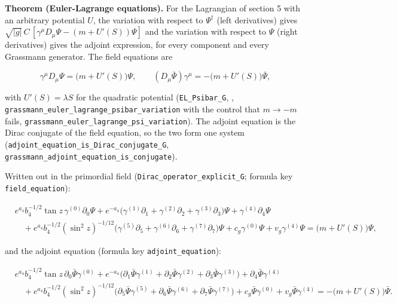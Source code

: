 \documentclass[11pt]{article}
\begin{document}
\textbf{Theorem (Euler-Lagrange equations).} For the Lagrangian of section 5 with an arbitrary potential $U$, the variation with respect to $\Psi^\dagger$ (left derivatives) gives $\sqrt{|g|}\,C\,[\gamma^\mu D_\mu\Psi - (m + U'(S))\Psi]$ and the variation with respect to $\Psi$ (right derivatives) gives the adjoint expression, for every component and every Grassmann generator. The field equations are

\[
\gamma^\mu D_\mu\Psi = \big(m + U'(S)\big)\Psi,\qquad (D_\mu\bar\Psi)\gamma^\mu = -\big(m + U'(S)\big)\bar\Psi,
\]

with $U'(S) = \lambda S$ for the quadratic potential (\texttt{EL\_Psiba\allowbreak{}r\_G}, \texttt{}, \texttt{grassman\allowbreak{}n\_euler\_\allowbreak{}lagrange\allowbreak{}\_psibar\_\allowbreak{}variatio\allowbreak{}n} with the control that $m \to -m$ fails, \texttt{grassman\allowbreak{}n\_euler\_\allowbreak{}lagrange\allowbreak{}\_psi\_var\allowbreak{}iation}). The adjoint equation is the Dirac conjugate of the field equation, so the two form one system (\texttt{adjoint\_\allowbreak{}equation\allowbreak{}\_is\_Dira\allowbreak{}c\_conjug\allowbreak{}ate\_G}, \texttt{grassman\allowbreak{}n\_adjoin\allowbreak{}t\_equati\allowbreak{}on\_is\_co\allowbreak{}njugate}).

Written out in the primordial field (\texttt{Dirac\_op\allowbreak{}erator\_e\allowbreak{}xplicit\_\allowbreak{}G}; formula key \texttt{field\_eq\allowbreak{}uation}):

\[
\begin{aligned}
&e^{a_4}b_4^{-1/2}\tan z\,\gamma^{(0)}\partial_0\Psi + e^{-a_4}\big(\gamma^{(1)}\partial_1 + \gamma^{(2)}\partial_2 + \gamma^{(3)}\partial_3\big)\Psi + \gamma^{(4)}\partial_4\Psi \\
&\quad + e^{a_4}b_4^{-1/2}(\sin^2 z)^{-1/12}\big(\gamma^{(5)}\partial_5 + \gamma^{(6)}\partial_6 + \gamma^{(7)}\partial_7\big)\Psi + c_g\gamma^{(0)}\Psi + v_g\gamma^{(4)}\Psi = \big(m + U'(S)\big)\Psi,
\end{aligned}
\]

and the adjoint equation (formula key \texttt{adjoint\_\allowbreak{}equation}):

\[
\begin{aligned}
&e^{a_4}b_4^{-1/2}\tan z\,\partial_0\bar\Psi\gamma^{(0)} + e^{-a_4}\big(\partial_1\bar\Psi\gamma^{(1)} + \partial_2\bar\Psi\gamma^{(2)} + \partial_3\bar\Psi\gamma^{(3)}\big) + \partial_4\bar\Psi\gamma^{(4)} \\
&\quad + e^{a_4}b_4^{-1/2}(\sin^2 z)^{-1/12}\big(\partial_5\bar\Psi\gamma^{(5)} + \partial_6\bar\Psi\gamma^{(6)} + \partial_7\bar\Psi\gamma^{(7)}\big) + c_g\bar\Psi\gamma^{(0)} + v_g\bar\Psi\gamma^{(4)} = -\big(m + U'(S)\big)\bar\Psi.
\end{aligned}
\]
\end{document}
